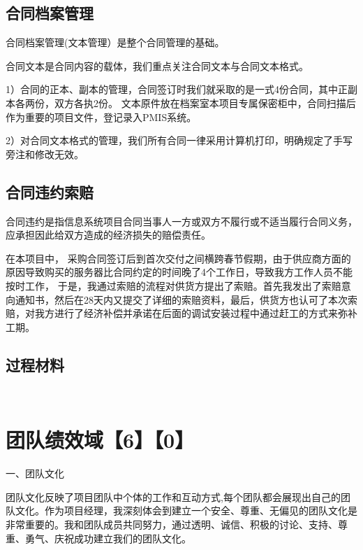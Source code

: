 \documentclass[UTF8]{../computerUniverse}
\begin{document}
\section{合同档案管理}

合同档案管理(文本管理）是整个合同管理的基础。

合同文本是合同内容的载体，我们重点关注合同文本与合同文本格式。

1）合同的正本、副本的管理，合同签订时我们就采取的是一式4份合同，其中正副本各两份，双方各执2份。
文本原件放在档案室本项目专属保密柜中，合同扫描后作为重要的项目文件，登记录入PMIS系统。

2）对合同文本格式的管理，我们所有合同一律采用计算机打印，明确规定了手写旁注和修改无效。



\section{合同违约索赔}

合同违约是指信息系统项目合同当事人一方或双方不履行或不适当履行合同义务，应承担因此给双方造成的经济损失的赔偿责任。

在本项目中，
采购合同签订后到首次交付之间横跨春节假期，由于供应商方面的原因导致购买的服务器比合同约定的时间晚了4个工作日，导致我方工作人员不能按时工作，
于是，我通过索赔的流程对供货方提出了索赔。首先我发出了索赔意向通知书，然后在28天内又提交了详细的索赔资料，最后，供货方也认可了本次索赔，对我方进行了经济补偿并承诺在后面的调试安装过程中通过赶工的方式来弥补工期。


\section{过程材料}

\begin{lstlisting}
   
\end{lstlisting}





\chapter{团队绩效域【6】【0】}



一、团队文化

团队文化反映了项目团队中个体的工作和互动方式,每个团队都会展现出自己的团队文化。作为项目经理，我深刻体会到建立一个安全、尊重、无偏见的团队文化是非常重要的。我和团队成员共同努力，通过透明、诚信、积极的讨论、支持、尊重、勇气、庆祝成功建立我们的团队文化。
\end{document}
